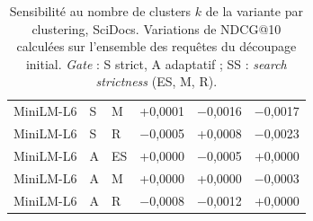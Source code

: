 \documentclass[a4paper,10pt]{article}
\begin{document}
\begin{table}[p]
\begin{tabular}{lllrrr}
MiniLM-L6 & S & M & +0,0001 & $-$0,0016 & $-$0,0017 \\
MiniLM-L6 & S & R & $-$0,0005 & +0,0008 & $-$0,0023 \\
MiniLM-L6 & A & ES & +0,0000 & $-$0,0005 & +0,0000 \\
MiniLM-L6 & A & M & +0,0000 & +0,0000 & $-$0,0003 \\
MiniLM-L6 & A & R & $-$0,0008 & $-$0,0012 & +0,0000 \\
\bottomrule
\end{tabular}
\caption{Sensibilité au nombre de clusters $k$ de la variante par clustering, SciDocs. Variations de NDCG@10 calculées sur l'ensemble des requêtes du découpage initial. \textit{Gate} : S strict, A adaptatif ; SS : \textit{search strictness} (ES, M, R).}
\label{tab:s-clusters-scidocs}
\end{table}
\end{document}
